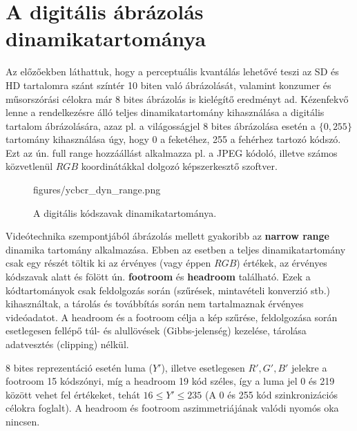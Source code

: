 \section{A digitális ábrázolás dinamikatartománya}

Az előzőekben láthattuk, hogy a perceptuális kvantálás lehetővé teszi az SD és HD tartalomra szánt színtér 10 biten való ábrázolását, valamint konzumer és műsorszórási célokra már 8 bites ábrázolás is kielégítő eredményt ad.
Kézenfekvő lenne a rendelkezésre álló teljes dinamikatartomány kihasználása a digitális tartalom ábrázolására, azaz pl. a világosságjel 8 bites ábrázolása esetén a $\lbrace 0, 255 \rbrace$ tartomány kihasználása úgy, hogy 0 a feketéhez, 255 a fehérhez tartozó kódszó.
Ezt az ún. full range hozzáállást alkalmazza pl. a JPEG kódoló, illetve számos közvetlenül $RGB$ koordinátákkal dolgozó képszerkesztő szoftver.

\begin{figure}[]
	\centering
	\begin{overpic}[width = 0.7\columnwidth ]{figures/ycbcr_dyn_range.png}
	\end{overpic}
	\caption{A digitális \ycbcr kódszavak dinamikatartománya.}
	\label{Fig:ycbcr_dyn_range}
\end{figure}
Videótechnika szempontjából \ycbcr ábrázolás mellett gyakoribb az \textbf{narrow range} dinamika tartomány alkalmazása.
Ebben az esetben a teljes dinamikatartomány csak egy részét töltik ki az érvényes \ycbcr (vagy éppen $RGB$) értékek, az érvényes kódszavak alatt és fölött ún. \textbf{footroom} és \textbf{headroom} található.
Ezek a kódtartományok csak feldolgozás során (szűrések, mintavételi konverzió stb.) kihasználtak, a tárolás és továbbítás során nem tartalmaznak érvényes videóadatot.
A headroom és a footroom célja a kép szűrése, feldolgozása során esetlegesen fellépő túl- és alullövések (Gibbs-jelenség) kezelése, tárolása adatvesztés (clipping) nélkül.

8 bites reprezentáció esetén luma ($Y'$), illetve esetlegesen $R',G',B'$ jelekre a footroom 15 kódszónyi, míg a headroom 19 kód széles, így a luma jel 0 és 219 között vehet fel értékeket, tehát $16 \leq Y' \leq 235$ (A 0 és 255 kód szinkronizációs célokra foglalt).
A headroom és footroom aszimmetriájának valódi nyomós oka nincsen.

